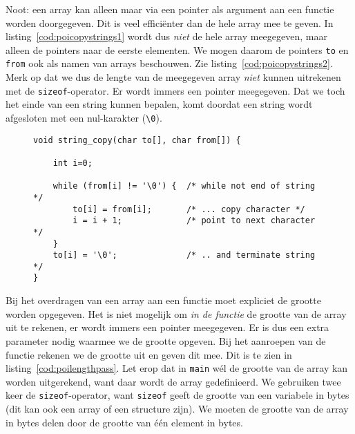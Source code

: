 Noot: een array kan alleen maar via een pointer als argument aan een functie worden doorgegeven. Dit is veel efficiënter dan de hele array mee te geven. In listing~\ref{cod:poicopystrings1} wordt dus \textsl{niet} de hele array meegegeven, maar alleen de pointers naar de eerste elementen. We mogen daarom de pointers \texttt{to} en \texttt{from} ook als namen van arrays beschouwen.  Zie listing~\ref{cod:poicopystrings2}. Merk op dat we dus de lengte van de meegegeven array \textsl{niet} kunnen uitrekenen met de \texttt{sizeof}-operator. Er wordt immers een pointer meegegeven. Dat we toch het einde van een string kunnen bepalen, komt doordat een string wordt afgesloten met een nul-karakter (\lstinline|\0|). %

\begin{figure}[!ht]
\begin{lstlisting}[caption=Functie voor het kopieren van een string met behulp van arrays.,label=cod:poicopystrings2]
void string_copy(char to[], char from[]) {

    int i=0;

    while (from[i] != '\0') {  /* while not end of string */
        to[i] = from[i];       /* ... copy character */
        i = i + 1;             /* point to next character */
    }
    to[i] = '\0';              /* .. and terminate string */
}
\end{lstlisting}
\end{figure}

Bij het overdragen van een array aan een functie moet expliciet de grootte worden opgegeven. Het is niet mogelijk om \textsl{in de functie} de grootte van de array uit te rekenen, er wordt immers een pointer meegegeven. Er is dus een extra parameter nodig waarmee we de grootte opgeven. Bij het aanroepen van de functie rekenen we de grootte uit en geven dit mee. Dit is te zien in listing~\ref{cod:poilengthpass}. Let erop dat in \texttt{main} w\'el de grootte van de array kan worden uitgerekend, want daar wordt de array gedefinieerd. We gebruiken twee keer de \texttt{sizeof}-operator, want \texttt{sizeof} geeft de grootte van een variabele in bytes (dit kan ook een array of een structure zijn). We moeten de grootte van de array in bytes delen door de grootte van \'e\'en element in bytes.

